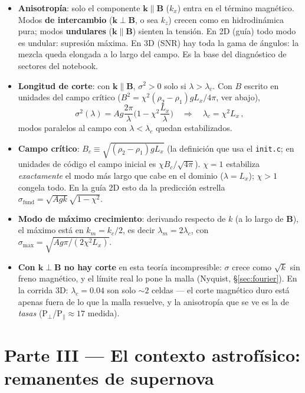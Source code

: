 \documentclass[11pt,a4paper]{article}
\newcommand{\B}{\mathbf{B}}
\newcommand{\code}[1]{\texttt{#1}}
\newcommand{\term}[1]{\textbf{#1}}
\begin{document}
\begin{itemize}
  \item \textbf{Anisotropía}: solo el componente $\mathbf{k}\parallel\B$ ($k_x$) entra en
  el término magnético. Modos \term{de intercambio} ($\mathbf{k}\perp\B$, o sea $k_z$)
  crecen como en hidrodinámica pura; modos \term{undulares} ($\mathbf{k}\parallel\B$) sienten
  la tensión. En 2D (guía) todo modo es undular: supresión máxima. En 3D (SNR) hay toda la
  gama de ángulos: la mezcla queda elongada a lo largo del campo. Es la base del diagnóstico
  de sectores del notebook.
  \item \textbf{Longitud de corte}: con $\mathbf{k}\parallel\B$,
  $\sigma^2>0$ solo si $\lambda>\lambda_c$. Con $B$ escrito en unidades del campo crítico
  ($B^2=\chi^2(\rho_2-\rho_1)gL_x/4\pi$, ver abajo),
  \begin{equation}
  \sigma^2(\lambda) = A g \frac{2\pi}{\lambda}\Big(1-\chi^2\frac{L_x}{\lambda}\Big)
  \quad\Rightarrow\quad
  \lambda_c = \chi^2 L_x\,,
  \end{equation}
  modos paralelos al campo con $\lambda<\lambda_c$ quedan estabilizados.
  \item \textbf{Campo crítico}: $B_c\equiv\sqrt{(\rho_2-\rho_1)gL_x}$ (la definición que
  usa el \code{init.c}; en unidades de código el campo inicial es $\chi B_c/\sqrt{4\pi}$).
  $\chi=1$ estabiliza \emph{exactamente} el modo más largo que cabe en el dominio
  ($\lambda=L_x$); $\chi>1$ congela todo. En la guía 2D esto da la predicción estrella
  $\sigma_\mathrm{fund}=\sqrt{Agk}\sqrt{1-\chi^2}$.
  \item \textbf{Modo de máximo crecimiento}: derivando respecto de $k$ (a lo largo de
  $\B$), el máximo está en $k_m=k_c/2$, es decir $\lambda_m=2\lambda_c$, con
  $\sigma_\mathrm{max}=\sqrt{A g\pi/(2\chi^2L_x)}$.
  \item \textbf{Con $\mathbf{k}\perp\B$ no hay corte} en esta teoría incompresible: $\sigma$
  crece como $\sqrt{k}$ sin freno magnético, y el límite real lo pone la malla (Nyquist,
  \S\ref{sec:fourier}). En la corrida 3D: $\lambda_c=0.04$ son solo $\sim2$ celdas --- el
  corte magnético duro está apenas fuera de lo que la malla resuelve, y la anisotropía
  que se ve es la de \emph{tasas} (P$_\perp$/P$_\parallel\approx17$ medida).
\end{itemize}

\part*{Parte III --- El contexto astrofísico: remanentes de supernova}
\end{document}
